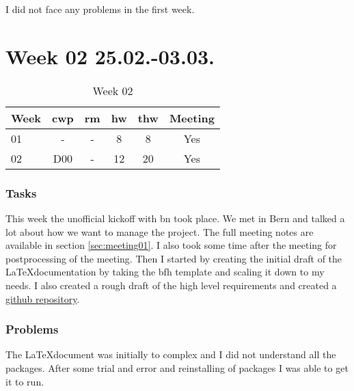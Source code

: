 I did not face any problems in the first week.

\section{Week 02 25.02.-03.03.}
\label{sec:journal:week02}

\begin{table}[!ht]
    \begin{center}
        \caption{Week 02}
        \label{tab:journal:week02}
        \begin{tabular}{l|c|c|c|c|c}
            \textbf{Week} & \textbf{\gls{cwp}} & \textbf{\gls{rm}} & \textbf{\gls{hw}} & \textbf{\gls{thw}} & \textbf{Meeting}\\
        \hline
        01 & - & - & 8 & 8 & Yes \\
        02 & D00 & - & 12 & 20 & Yes \\
        \end{tabular}
    \end{center}
\end{table}

\subsubsection{Tasks}

This week the unofficial kickoff with \gls{bn} took place. We met in Bern and talked a lot about how we want to manage the project. The full meeting notes are available in section \ref{sec:meeting01}. I also took some time after the meeting for postprocessing of the meeting. Then I started by creating the initial draft of the \LaTeX documentation by taking the \gls{bfh} template and scaling it down to my needs. I also created a rough draft of the high level requirements and created a \href{https://github.com/Tartori/hids_thesis}{github repository}. 

\subsubsection{Problems}

The \LaTeX document was initially to complex and I did not understand all the packages. After some trial and error and reinstalling of packages I was able to get it to run. 

